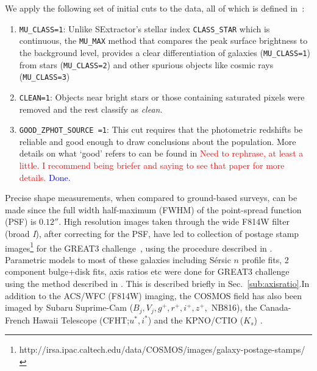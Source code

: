 \documentclass[twocolumn,useAMS,usenatbib]{mn2e}
\newcommand{\rachel}[1]{{\textcolor{red}{#1}}}
\newcommand{\arun}[1]{{\textcolor{blue}{#1}}}
\newcommand{\sersicn}{S\'{e}rsic $n$ }
\begin{document}
We apply the following set of initial cuts to the data, all of which is defined in~\cite{COSMOS_Alexie}:
\begin{enumerate}
 \item \texttt{MU\_CLASS=1}: Unlike SExtractor's stellar index \texttt{CLASS\_STAR} which is continuous, the \texttt{MU\_MAX} method that compares the peak surface brightness to the background level,
 provides a clear differentiation of galaxies (\texttt{MU\_CLASS=1}) from stars (\texttt{MU\_CLASS=2}) and other spurious objects like cosmic rays (\texttt{MU\_CLASS=3})
 
 \item \texttt{CLEAN=1}: Objects near bright stars or those containing saturated pixels were removed and the rest classify as \emph{clean}.
 
 \item \texttt{GOOD\_ZPHOT\_SOURCE =1}: This cut requires that the photometric redshifts be reliable and good enough to draw conclusions about the population. More details on what `good' refers to can be found in \cite{SHERA}
\rachel{Need to rephrase, at least a little.  I recommend being
  briefer and saying to see that paper for more details.} \arun{Done.}
\end{enumerate}

Precise shape measurements, when compared to ground-based surveys, can be made since the full width half-maximum (FWHM) of the point-spread function (PSF)
is $0.12''$. High resolution images taken through the wide F814W filter (broad \emph{I}), after correcting for the PSF, have led to collection of postage stamp images\footnote{http://irsa.ipac.caltech.edu/data/COSMOS/images/galaxy-postage-stamps/} for the GREAT3 challenge~\citep{great3}, using the procedure described in \cite{SHERA}.
Parametric models to most of these galaxies including \sersicn profile fits, 
2 component bulge+disk fits, axis ratios etc were done for GREAT3 challenge~\citep{great3} using the method described in \cite{Claire_Fits}. This is described briefly in Sec.~\ref{sub:axisratio}.In addition to the ACS/WFC (F814W) imaging, the COSMOS field has also been imaged by Subaru Suprime-Cam ($B_j, V_j, g^+,r^+,i^+,z^+,$ NB816), the
Canada-French Hawaii Telescope (CFHT;$u^*,i^*$) and the KPNO/CTIO ($K_s$) .
	      
\end{document}

